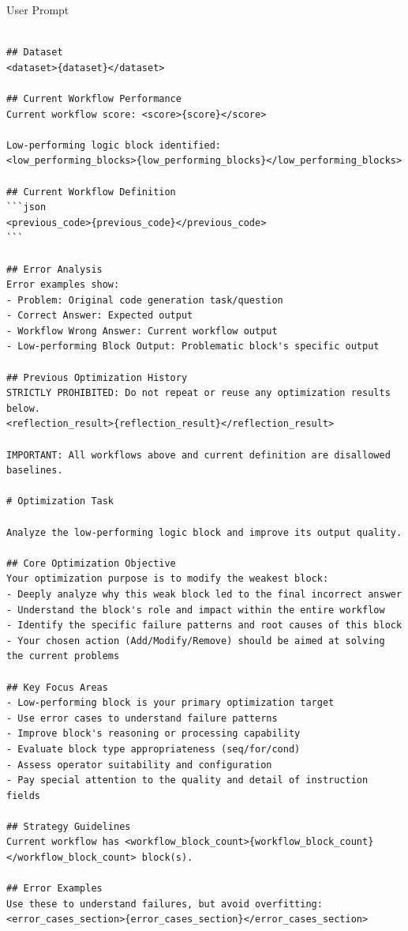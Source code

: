 \documentclass{article}
\theoremstyle{plain}
\theoremstyle{definition}
\theoremstyle{remark}
\begin{document}
\begin{promptbox}{User Prompt}
\begin{Verbatim}[fontsize=\small]

## Dataset
<dataset>{dataset}</dataset>

## Current Workflow Performance
Current workflow score: <score>{score}</score>

Low-performing logic block identified:
<low_performing_blocks>{low_performing_blocks}</low_performing_blocks>

## Current Workflow Definition
```json
<previous_code>{previous_code}</previous_code>
```

## Error Analysis
Error examples show:
- Problem: Original code generation task/question
- Correct Answer: Expected output
- Workflow Wrong Answer: Current workflow output
- Low-performing Block Output: Problematic block's specific output

## Previous Optimization History
STRICTLY PROHIBITED: Do not repeat or reuse any optimization results below.
<reflection_result>{reflection_result}</reflection_result>

IMPORTANT: All workflows above and current definition are disallowed baselines.

# Optimization Task

Analyze the low-performing logic block and improve its output quality.

## Core Optimization Objective
Your optimization purpose is to modify the weakest block:
- Deeply analyze why this weak block led to the final incorrect answer
- Understand the block's role and impact within the entire workflow
- Identify the specific failure patterns and root causes of this block
- Your chosen action (Add/Modify/Remove) should be aimed at solving the current problems

## Key Focus Areas
- Low-performing block is your primary optimization target
- Use error cases to understand failure patterns
- Improve block's reasoning or processing capability
- Evaluate block type appropriateness (seq/for/cond)
- Assess operator suitability and configuration
- Pay special attention to the quality and detail of instruction fields

## Strategy Guidelines
Current workflow has <workflow_block_count>{workflow_block_count}</workflow_block_count> block(s).

## Error Examples
Use these to understand failures, but avoid overfitting:
<error_cases_section>{error_cases_section}</error_cases_section>

\end{Verbatim}
\end{promptbox}


\end{document}
